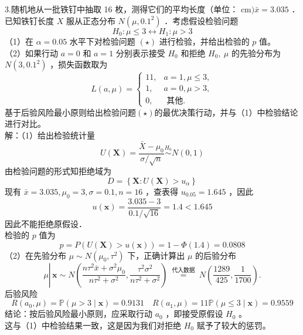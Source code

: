 \documentclass[UTF8,openany]{book}
\begin{document}
	
	\noindent 3.随机地从一批铁钉中抽取 16 枚，测得它们的平均长度（单位： cm$) \bar{x}=3.035$ ．已知铁钉长度 $X$ 服从正态分布 $N\left(\mu, 0.1^2\right)$ ．考虑假设检验问题
	\begin{equation}
		H_0: \mu \leq 3 \longleftrightarrow H_1: \mu > 3 \tag{$\star$}
	\end{equation}
	（1）在 $\alpha=0.05$ 水平下对检验问题 $(\star)$ 进行检验，并给出检验的 $p$ 值。\\
	（2）如果行动 $a=0$ 和 $a=1$ 分别表示接受 $H_0$ 和拒绝 $H_0, ~ \mu$ 的先验分布为 $N\left(3,0.1^2\right)$ ，损失函数取为
	$$
	L(a, \mu)= \begin{cases}11, & a=1, \mu \leq 3, \\ 1, & a=0, \mu>3, \\ 0, & \text { 其他. }\end{cases}
	$$
	基于后验风险最小原则给出检验问题$(\star)$的最优决策行动，并与（1）中检验结论进行对比。\\
	解：（1）给出检验统计量
	$$U(\boldsymbol{X})=\frac{\bar{X}-\mu_0}{\sigma / \sqrt{n}} \stackrel{H_0}{\sim} N(0,1)$$
	由检验问题的形式知拒绝域为 
	$$D=\left\{\boldsymbol{X}: U(\boldsymbol{X})>u_\alpha\right\}$$
	现有 $\bar{x}=3.035, \mu_0=3, \sigma=0.1, n=16$ ，查表得 $u_{0.05}=1.645$ ，因此
	$$
	u(\boldsymbol{x})=\frac{3.035-3}{0.1 / \sqrt{16}}=1.4<1.645
	$$
	因此不能拒绝原假设．\\
	检验的 $p$ 值为 $$p=P(U(\boldsymbol{X})>u(\boldsymbol{x}))=1-\Phi(1.4)=0.0808$$
	（2）在先验分布 $\mu \sim N\left(\mu_0, \tau^2\right)$ 下，正确计算出 $\mu$ 的后验分布
	$$
	\mu \left\lvert\, \boldsymbol{x} \sim N\left(\frac{n \tau^2 \bar{x}+\sigma^2 \mu_0}{n \tau^2+\sigma^2}, \frac{\tau^2 \sigma^2}{n \tau^2+\sigma^2}\right) \stackrel{\text { 代入数据 }}{=} N\left(\frac{1289}{425}, \frac{1}{1700}\right) .\right.
	$$
	后验风险 
	$$R\left(a_0, \mu\right)=\mathbb{P}(\mu>3 \mid \boldsymbol{x})=0.9131\quad R\left(a_1, \mu\right)=11 \mathbb{P}(\mu \leq 3 \mid \boldsymbol{x})=0.9559$$
	结论：按后验风险最小原则，应采取行动 $a_0$ ，即接受原假设 $H_0$ 。\\
	这与（1）中检验结果一致，这是因为我们对拒绝 $H_0$ 赋予了较大的惩罚。\\
	
	
	
\end{document}
